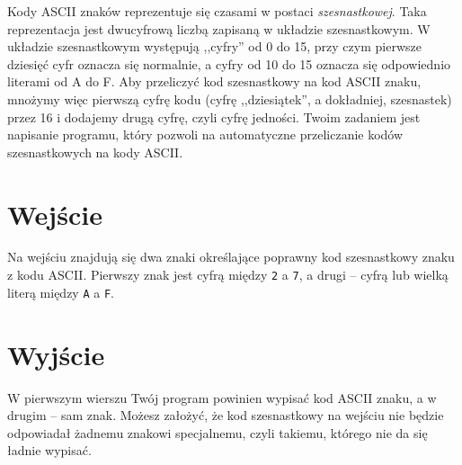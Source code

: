 \documentclass{spiral-kurs}
\begin{document}
\makeheader
%
    Kody ASCII znaków reprezentuje się czasami w postaci \emph{szesnastkowej}.
    Taka reprezentacja jest dwucyfrową liczbą zapisaną w układzie szesnastkowym.
    W układzie szesnastkowym występują ,,cyfry'' od 0 do 15, przy czym pierwsze dziesięć
    cyfr oznacza się normalnie, a cyfry od 10 do 15 oznacza się odpowiednio literami od A do F.
    Aby przeliczyć kod szesnastkowy na kod ASCII znaku, mnożymy więc pierwszą cyfrę kodu
    (cyfrę ,,dziesiątek'', a dokładniej, szesnastek) przez 16 i dodajemy drugą cyfrę, czyli
    cyfrę jedności.
    Twoim zadaniem jest napisanie programu, który pozwoli na automatyczne przeliczanie kodów
    szesnastkowych na kody ASCII.

    \section{Wejście}
    Na wejściu znajdują się dwa znaki określające poprawny kod szesnastkowy
    znaku z kodu ASCII.
    Pierwszy znak jest cyfrą między \texttt{2} a \texttt{7}, a drugi -- cyfrą lub wielką literą
    między \texttt{A} a \texttt{F}.
      
    \section{Wyjście}
    W pierwszym wierszu Twój program powinien wypisać kod ASCII znaku,
    a w drugim -- sam znak.
    Możesz założyć, że kod szesnastkowy na wejściu nie będzie odpowiadał
    żadnemu znakowi specjalnemu, czyli takiemu, którego nie da się ładnie wypisać.


  
\end{document}
